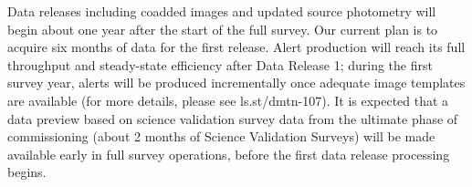 Data releases including coadded images and updated source photometry will begin about one year
after the start of the full survey. Our current plan is to acquire six months of data for the first release.
Alert production will reach its full throughput and steady-state efficiency after Data Release 1; during
the first survey year, alerts will be produced incrementally once adequate image templates are
available (for more details, please see ls.st/dmtn-107). It is expected that a data preview based on
science validation survey data from the ultimate phase of commissioning (about 2 months of Science
Validation Surveys) will be made available early in full survey operations, before the first data release
processing begins.
